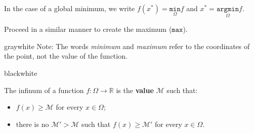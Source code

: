 \begin{center}
\end{center}

In the case of a global minimum, we write \( f(x^*) = \underset{\Omega}{\mathtt{min}}f \) and \( x^* = \underset{\Omega}{\mathtt{argmin}} f \). 

Proceed in a similar manner to create the maximum (\( \mathtt{max} \)).

\begin{remark}{gray}{white}
    Note: The words \textit{minimum} and \textit{maximum} refer to the coordinates of the point, not the value of the function.

\end{remark}

\begin{remark}{black}{white}
    \begin{definition}[infimum]
        The infinum of a function \( f : \Omega \rightarrow \mathbb{R} \) is the \textbf{value} \( \mathcal{M} \) such that:
        \begin{itemize}
            \item \( f(x) \geq \mathcal{M} \) for every \( x \in \Omega \);
            \item there is no \( \mathcal{M}' > \mathcal{M} \) such that \( f(x) \geq \mathcal{M}' \) for every \( x \in \Omega \). 
        \end{itemize}
    \end{definition}
\end{remark}

